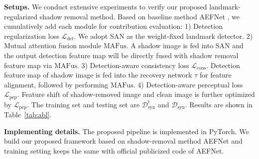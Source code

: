 \documentclass[10pt,twocolumn,letterpaper]{article}
\newcommand{\tableref}[1]{Table~\ref{#1}}
\renewcommand{\paragraph}[1]{\vspace{1.25mm}\noindent\textbf{#1}}
\begin{document}
\paragraph{Setups.} 
We conduct extensive experiments to verify our proposed landmark-regularized shadow removal method. 
Based on baseline method AEFNet \cite{fu2021auto}, we cumulatively add each module for contribution evaluation: 1) Detection regularization loss $\mathcal{L}_\mathrm{det}$. We adopt SAN \cite{dong2018style} as the weight-fixed landmark detector. 2) Mutual attention fusion module $\text{MAFus}$. A shadow image is fed into SAN and the output detection feature map will be directly fused with shadow removal feature map via $\text{MAFus}$. 3) Detection-aware consistency loss $\mathcal{L}_\mathrm{cons}$. Detection feature map of shadow image is fed into the recovery network $\tau$ for feature alignment, followed by performing $\text{MAFus}$.
4) Detection-aware perceptual loss $\mathcal{L}_\mathrm{pep}$. Feature shift of shadow-removed image and clean image is further optimized by $\mathcal{L}_\mathrm{pep}$. The training set and testing set are $\mathcal{D}^\text{t}_\text{syn}$ and $\mathcal{D}_\text{syn}$. Results are shown in \tableref{tab:abl}. 

\paragraph{Implementing details.} 
The proposed pipeline is implemented in PyTorch. We build our proposed framework based on shadow-removal method AEFNet \cite{fu2021auto} and training setting keeps the same with official publicized code of AEFNet. 
\end{document}
